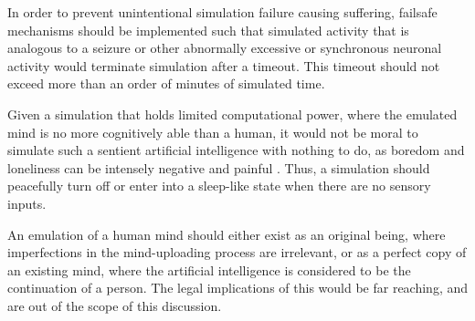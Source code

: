 In order to prevent unintentional simulation failure causing suffering, failsafe
mechanisms should be implemented such that simulated activity that is analogous
to a seizure or other abnormally excessive or synchronous neuronal activity
would terminate simulation after a timeout. This timeout should not exceed more
than an order of minutes of simulated time.

Given a simulation that holds limited computational power, where the emulated
mind is no more cognitively able than a human, it would not be moral to simulate
such a sentient artificial intelligence with nothing to do, as boredom and
loneliness can be intensely negative and painful
\autocite{hawkley_loneliness_2010}. Thus, a simulation should peacefully turn
off or enter into a sleep-like state when there are no sensory inputs.

An emulation of a human mind should either exist as an original being, where
imperfections in the mind-uploading process are irrelevant, or as a perfect copy
of an existing mind, where the artificial intelligence is considered to be the
continuation of a person. The legal implications of this would be far reaching,
and are out of the scope of this discussion.



